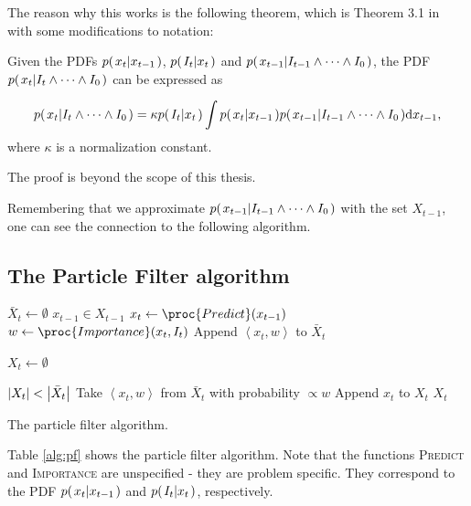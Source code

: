 The reason why this works is the following theorem, which is Theorem
3.1 in \cite{Hedvig} with some modifications to notation:

\begin{theorem}
  Given the PDFs $p{(\left. x_t \middle\vert x_{t-1} \right.)}$, $p{(\left. I_t \middle\vert x_t \right.)}$ and
  $p{(\left. x_{t-1} \middle\vert I_{t-1} \wedge \dots \wedge I_0 \right.)}$, the PDF
  $p{(\left. x_t \middle\vert I_t \wedge \dots \wedge I_0 \right.)}$ can be expressed as

\begin{equation}
  p{(\left. x_t \middle\vert I_t \wedge \dots \wedge I_0 \right.)} = \kappa p{(\left. I_t \middle\vert x_t \right.)} \int{ p{(\left. x_t \middle\vert x_{t-1} \right.)}p{(\left. x_{t-1} \middle\vert I_{t-1} \wedge \dots \wedge I_0 \right.)} \mathrm{d}x_{t-1}},
  \label{thm:pf-grand}
\end{equation}
where $\kappa$ is a normalization constant\cite{Hedvig}.
\end{theorem}

The proof is beyond the scope of this thesis.

Remembering that we approximate $p{(\left. x_{t-1} \middle\vert I_{t-1} \wedge \dots
  \wedge I_0 \right.)}$ with the set $X_{t-1}$, one can see the connection to
the following algorithm.


\subsection{The Particle Filter algorithm}
\begin{table}[h]
  \begin{codebox}
    \li $\bar{X}_t \gets \emptyset$
    \li \ForEach $x_{t-1} \in X_{t-1}$
    \li \Do
    \li $x_t \gets \proc{Predict}(x_{t-1})$
    \li $w \gets \proc{Importance}(x_t,I_t)$
    \li Append $\left<x_t, w\right>$ to $\bar{X}_t$
    \End
    \li
    
    \li $X_t \gets \emptyset$
    
    \li \While $\left\vert X_t \right\vert < \left\vert \bar{X}_t \right\vert$
    \li \Do
    \li Take $\left<x_t, w\right>$ from $\bar{X}_t$ with probability $\propto w$
    \li Append $x_t$ to $X_t$
    \End
    \li \Return $X_t$
  \end{codebox}
  \caption{The particle filter algorithm.}
  \label{alg:pf}
\end{table}

Table \ref{alg:pf} shows the particle filter algorithm. Note that the
functions \textsc{Predict} and \textsc{Importance} are unspecified -
they are problem specific. They correspond to the PDF $p{(\left. x_t \middle\vert x_{t-1} \right.)}$
and $p{(\left. I_t \middle\vert x_t \right.)}$, respectively.

